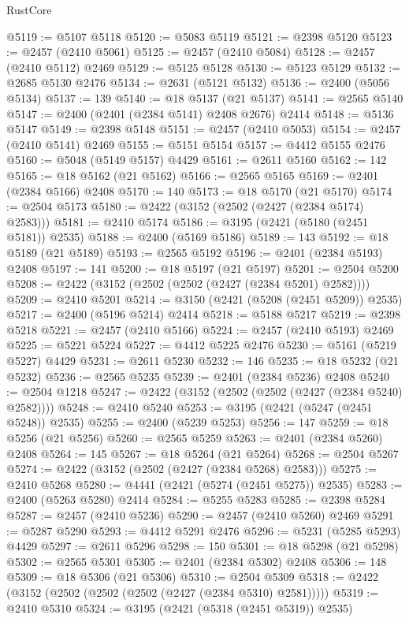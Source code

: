 \begin{lexlean}{RustCore}
\begin{coremodule}
@5119 := @5107 @5118
@5120 := @5083 @5119
@5121 := @2398 @5120
@5123 := @2457 (@2410 @5061)
@5125 := @2457 (@2410 @5084)
@5128 := @2457 (@2410 @5112) @2469
@5129 := @5125 @5128
@5130 := @5123 @5129
@5132 := @2685 @5130 @2476
@5134 := @2631 (@5121 @5132)
@5136 := @2400 (@5056 @5134)
@5137 := 139
@5140 := @18 @5137 (@21 @5137)
@5141 := @2565 @5140
@5147 := @2400 (@2401 (@2384 @5141) @2408 @2676) @2414
@5148 := @5136 @5147
@5149 := @2398 @5148
@5151 := @2457 (@2410 @5053)
@5154 := @2457 (@2410 @5141) @2469
@5155 := @5151 @5154
@5157 := @4412 @5155 @2476
@5160 := @5048 (@5149 @5157) @4429
@5161 := @2611 @5160
@5162 := 142
@5165 := @18 @5162 (@21 @5162)
@5166 := @2565 @5165
@5169 := @2401 (@2384 @5166) @2408
@5170 := 140
@5173 := @18 @5170 (@21 @5170)
@5174 := @2504 @5173
@5180 := @2422 (@3152 (@2502 (@2427 (@2384 @5174) @2583)))
@5181 := @2410 @5174
@5186 := @3195 (@2421 (@5180 (@2451 @5181)) @2535)
@5188 := @2400 (@5169 @5186)
@5189 := 143
@5192 := @18 @5189 (@21 @5189)
@5193 := @2565 @5192
@5196 := @2401 (@2384 @5193) @2408
@5197 := 141
@5200 := @18 @5197 (@21 @5197)
@5201 := @2504 @5200
@5208 := @2422 (@3152 (@2502 (@2502 (@2427 (@2384 @5201) @2582))))
@5209 := @2410 @5201
@5214 := @3150 (@2421 (@5208 (@2451 @5209)) @2535)
@5217 := @2400 (@5196 @5214) @2414
@5218 := @5188 @5217
@5219 := @2398 @5218
@5221 := @2457 (@2410 @5166)
@5224 := @2457 (@2410 @5193) @2469
@5225 := @5221 @5224
@5227 := @4412 @5225 @2476
@5230 := @5161 (@5219 @5227) @4429
@5231 := @2611 @5230
@5232 := 146
@5235 := @18 @5232 (@21 @5232)
@5236 := @2565 @5235
@5239 := @2401 (@2384 @5236) @2408
@5240 := @2504 @1218
@5247 := @2422 (@3152 (@2502 (@2502 (@2427 (@2384 @5240) @2582))))
@5248 := @2410 @5240
@5253 := @3195 (@2421 (@5247 (@2451 @5248)) @2535)
@5255 := @2400 (@5239 @5253)
@5256 := 147
@5259 := @18 @5256 (@21 @5256)
@5260 := @2565 @5259
@5263 := @2401 (@2384 @5260) @2408
@5264 := 145
@5267 := @18 @5264 (@21 @5264)
@5268 := @2504 @5267
@5274 := @2422 (@3152 (@2502 (@2427 (@2384 @5268) @2583)))
@5275 := @2410 @5268
@5280 := @4441 (@2421 (@5274 (@2451 @5275)) @2535)
@5283 := @2400 (@5263 @5280) @2414
@5284 := @5255 @5283
@5285 := @2398 @5284
@5287 := @2457 (@2410 @5236)
@5290 := @2457 (@2410 @5260) @2469
@5291 := @5287 @5290
@5293 := @4412 @5291 @2476
@5296 := @5231 (@5285 @5293) @4429
@5297 := @2611 @5296
@5298 := 150
@5301 := @18 @5298 (@21 @5298)
@5302 := @2565 @5301
@5305 := @2401 (@2384 @5302) @2408
@5306 := 148
@5309 := @18 @5306 (@21 @5306)
@5310 := @2504 @5309
@5318 := @2422 (@3152 (@2502 (@2502 (@2502 (@2427 (@2384 @5310) @2581)))))
@5319 := @2410 @5310
@5324 := @3195 (@2421 (@5318 (@2451 @5319)) @2535)

\end{coremodule}
\end{lexlean}
